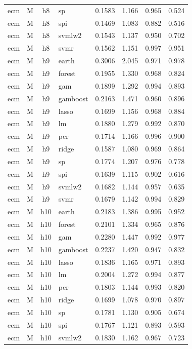 \begin{ThreePartTable}
\begin{longtable}[t]{llclcccc}
ecm & M & h8 & sp & 0.1583 & 1.166 & 0.965 & 0.524\\
ecm & M & h8 & spi & 0.1469 & 1.083 & 0.882 & 0.516\\
ecm & M & h8 & svmlw2 & 0.1543 & 1.137 & 0.950 & 0.702\\
ecm & M & h8 & svmr & 0.1562 & 1.151 & 0.997 & 0.951\\
\addlinespace
ecm & M & h9 & earth & 0.3006 & 2.045 & 0.971 & 0.978\\
ecm & M & h9 & forest & 0.1955 & 1.330 & 0.968 & 0.824\\
ecm & M & h9 & gam & 0.1899 & 1.292 & 0.994 & 0.893\\
ecm & M & h9 & gamboost & 0.2163 & 1.471 & 0.960 & 0.896\\
ecm & M & h9 & lasso & 0.1699 & 1.156 & 0.968 & 0.884\\
ecm & M & h9 & lm & 0.1880 & 1.279 & 0.992 & 0.870\\
ecm & M & h9 & pcr & 0.1714 & 1.166 & 0.996 & 0.900\\
ecm & M & h9 & ridge & 0.1587 & 1.080 & 0.969 & 0.864\\
ecm & M & h9 & sp & 0.1774 & 1.207 & 0.976 & 0.778\\
ecm & M & h9 & spi & 0.1639 & 1.115 & 0.902 & 0.616\\
ecm & M & h9 & svmlw2 & 0.1682 & 1.144 & 0.957 & 0.635\\
ecm & M & h9 & svmr & 0.1679 & 1.142 & 0.994 & 0.829\\
\addlinespace
ecm & M & h10 & earth & 0.2183 & 1.386 & 0.995 & 0.952\\
ecm & M & h10 & forest & 0.2101 & 1.334 & 0.965 & 0.876\\
ecm & M & h10 & gam & 0.2280 & 1.447 & 0.992 & 0.977\\
ecm & M & h10 & gamboost & 0.2237 & 1.420 & 0.947 & 0.832\\
ecm & M & h10 & lasso & 0.1836 & 1.165 & 0.971 & 0.893\\
ecm & M & h10 & lm & 0.2004 & 1.272 & 0.994 & 0.877\\
ecm & M & h10 & pcr & 0.1803 & 1.144 & 0.993 & 0.820\\
ecm & M & h10 & ridge & 0.1699 & 1.078 & 0.970 & 0.897\\
ecm & M & h10 & sp & 0.1781 & 1.130 & 0.905 & 0.674\\
ecm & M & h10 & spi & 0.1767 & 1.121 & 0.893 & 0.593\\
ecm & M & h10 & svmlw2 & 0.1830 & 1.162 & 0.967 & 0.723\\

\end{longtable}
\end{ThreePartTable}

